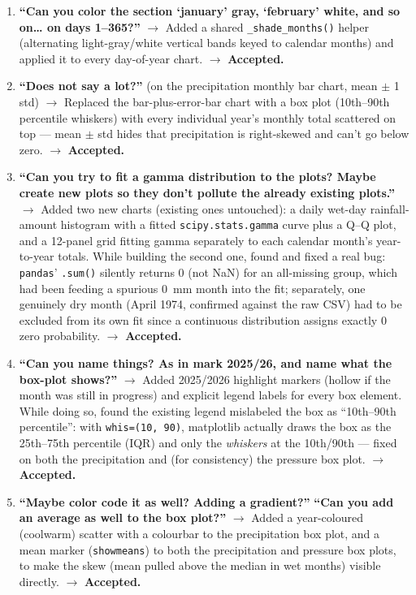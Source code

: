\begin{enumerate}[leftmargin=*, itemsep=0.8em]
\item \textbf{``Can you color the section `january' gray, `february' white, and so on\ldots
on days 1--365?''}
$\rightarrow$ Added a shared \texttt{\_shade\_months()} helper (alternating light-gray/white
vertical bands keyed to calendar months) and applied it to every day-of-year chart.
$\rightarrow$ \textbf{Accepted.}

\item \textbf{``Does not say a lot?''} (on the precipitation monthly bar chart, mean $\pm$ 1
std)
$\rightarrow$ Replaced the bar-plus-error-bar chart with a box plot (10th--90th percentile
whiskers) with every individual year's monthly total scattered on top --- mean $\pm$ std
hides that precipitation is right-skewed and can't go below zero.
$\rightarrow$ \textbf{Accepted.}

\item \textbf{``Can you try to fit a gamma distribution to the plots? Maybe create new plots
so they don't pollute the already existing plots.''}
$\rightarrow$ Added two new charts (existing ones untouched): a daily wet-day rainfall-amount
histogram with a fitted \texttt{scipy.stats.gamma} curve plus a Q--Q plot, and a 12-panel grid
fitting gamma separately to each calendar month's year-to-year totals. While building the
second one, found and fixed a real bug: \texttt{pandas}' \texttt{.sum()} silently returns 0
(not NaN) for an all-missing group, which had been feeding a spurious 0~mm month into the
fit; separately, one genuinely dry month (April 1974, confirmed against the raw CSV) had to
be excluded from its own fit since a continuous distribution assigns exactly 0 zero
probability.
$\rightarrow$ \textbf{Accepted.}

\item \textbf{``Can you name things? As in mark 2025/26, and name what the box-plot
shows?''}
$\rightarrow$ Added 2025/2026 highlight markers (hollow if the month was still in progress)
and explicit legend labels for every box element. While doing so, found the existing legend
mislabeled the box as ``10th--90th percentile'': with \texttt{whis=(10, 90)}, matplotlib
actually draws the box as the 25th--75th percentile (IQR) and only the \emph{whiskers} at the
10th/90th --- fixed on both the precipitation and (for consistency) the pressure box plot.
$\rightarrow$ \textbf{Accepted.}

\item \textbf{``Maybe color code it as well? Adding a gradient?''} \textbf{``Can you add an
average as well to the box plot?''}
$\rightarrow$ Added a year-coloured (coolwarm) scatter with a colourbar to the precipitation
box plot, and a mean marker (\texttt{showmeans}) to both the precipitation and pressure box
plots, to make the skew (mean pulled above the median in wet months) visible directly.
$\rightarrow$ \textbf{Accepted.}


\end{enumerate}
